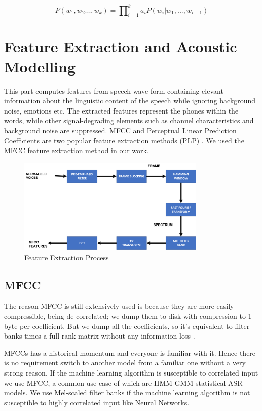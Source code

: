 \begin{equation}
P(w_{1},w_{2}...,w_{k}) = \prod\nolimits_{i = 1}^{k} a_{i} P(w_{i} | w_{1},...,w_{i-1})
\end{equation}

\section{Feature Extraction and Acoustic Modelling}
\label{sec:feature-extraction-and-AM}
This part computes features from speech wave-form containing elevant information about the linguistic content of the speech while ignoring background noise, emotions etc. The extracted features represent the phones within the words, while other signal-degrading elements such as channel characteristics and background noise are suppressed. MFCC and Perceptual Linear Prediction Coefficients are two popular feature extraction methods (PLP) \cite{backstrom_introduction_2022}. We used the MFCC feature extraction method in our work.  

\begin{figure}[h]
    \centering
    \includegraphics[width=0.8\textwidth]{img/feature extraction.png}
    \caption{Feature Extraction Process}
    \label{fig:Feature-extraction}
\end{figure}

\subsection{MFCC}
\label{sub:MFCC-trg}

The reason MFCC is still extensively used \cite{noauthor_kaldi_nodate} is because they are more easily compressible, being de-correlated; we dump them to disk with compression to 1 byte per coefficient. But we dump all the coefficients, so it’s equivalent to filter-banks times a full-rank matrix without any information loss \cite{raj_note_nodate}. 

MFCCs has a historical momentum and everyone is familiar with it. Hence there is no requirement switch to another model from a familiar one without a very strong reason. If the machine learning algorithm is susceptible to correlated input we use MFCC, a common use case of which are HMM-GMM statistical ASR models. We use Mel-scaled filter banks if the machine learning algorithm is not susceptible to highly correlated input like Neural Networks. 

